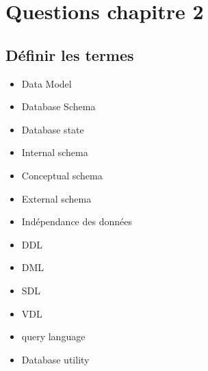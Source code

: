 \section{Questions chapitre 2}

\subsection{Définir les termes}
\begin{itemize}
	\item Data Model
	\item Database Schema
	\item Database state
	\item Internal schema
	\item Conceptual schema
	\item External schema
	\item Indépendance des données
	\item DDL
	\item DML
	\item SDL
	\item VDL
	\item query language
	\item Database utility
\end{itemize}


